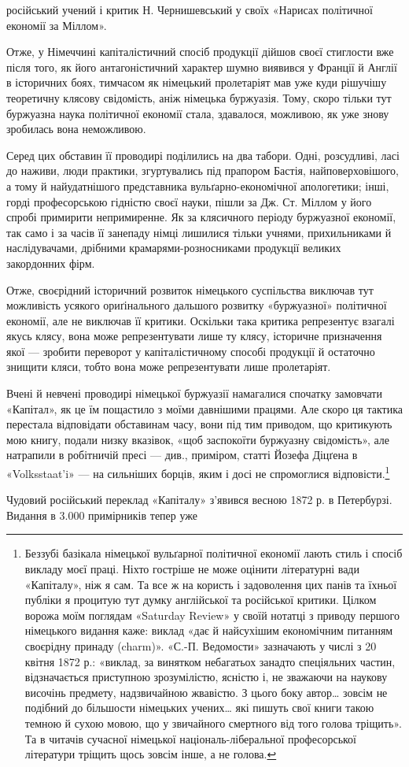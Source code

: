 \parcont{}  %
російський учений і критик Н. Чернишевський у своїх «Нарисах
політичної економії за Міллом».

Отже, у Німеччині капіталістичний спосіб продукції дійшов
своєї стиглости вже після того, як його антагоністичний характер
шумно виявився у Франції й Англії в історичних боях, тимчасом
як німецький пролетаріят мав уже куди рішучішу теоретичну
клясову свідомість, аніж німецька буржуазія. Тому, скоро тільки
тут буржуазна наука політичної економії стала, здавалося, можливою,
як уже знову зробилась вона неможливою.

Серед цих обставин її проводирі поділились на два табори.
Одні, розсудливі, ласі до наживи, люди практики, згуртувались
під прапором Бастія, найповерховішого, а тому й найудатнішого
представника вульґарно-економічної апологетики; інші, горді
професорською гідністю своєї науки, пішли за Дж. Ст. Міллом у
його спробі примирити непримиренне. Як за клясичного періоду
буржуазної економії, так само і за часів її занепаду німці лишилися
тільки учнями, прихильниками й наслідувачами, дрібними
крамарями-розносниками продукції великих закордонних фірм.

Отже, своєрідний історичний розвиток німецького суспільства
виключав тут можливість усякого ориґінального дальшого розвитку
«буржуазної» політичної економії, але не виключав її
критики. Оскільки така критика репрезентує взагалі якусь клясу,
вона може репрезентувати лише ту клясу, історичне призначення
якої — зробити переворот у капіталістичному способі продукції
й остаточно знищити кляси, тобто вона може репрезентувати лише
пролетаріят.

Вчені й невчені проводирі німецької буржуазії намагалися
спочатку замовчати «Капітал», як це їм пощастило з моїми давнішими
працями. Але скоро ця тактика перестала відповідати
обставинам часу, вони під тим приводом, що критикують мою
книгу, подали низку вказівок, «щоб заспокоїти буржуазну свідомість»,
але натрапили в робітничій пресі — див., приміром,
статті Йозефа Діцґена в «Volksstaat’i» — на сильніших борців,
яким і досі не спромоглися відповісти.\footnote{
Беззубі базікала німецької вульґарної політичної економії лають
стиль і спосіб викладу моєї праці. Ніхто гостріше не може оцінити літературні
вади «Капіталу», ніж я сам. Та все ж на користь і задоволення
цих панів та їхньої публіки я процитую тут думку англійської та російської
критики. Цілком ворожа моїм поглядам «Saturday Review» у своїй
нотатці з приводу першого німецького видання каже: виклад «дає й
найсухішим економічним питанням своєрідну принаду (charm)». «С.-П.
Ведомости» зазначають у числі з 20 квітня 1872 р.: «виклад, за винятком
небагатьох занадто спеціяльних частин, відзначається приступною зрозумілістю,
ясністю і, не зважаючи на наукову височінь предмету, надзвичайною
жвавістю. З цього боку автор\dots{} зовсім не подібний до більшости
німецьких учених\dots{} які пишуть свої книги такою темною й сухою мовою,
що у звичайного смертного від того голова тріщить». Та в читачів сучасної
німецької національ-ліберальної професорської літератури тріщить
щось зовсім інше, а не голова.
}

Чудовий російський переклад «Капіталу» з’явився весною
1872 р. в Петербурзі. Видання в 3.000 примірників тепер уже
\parbreak{}  %
